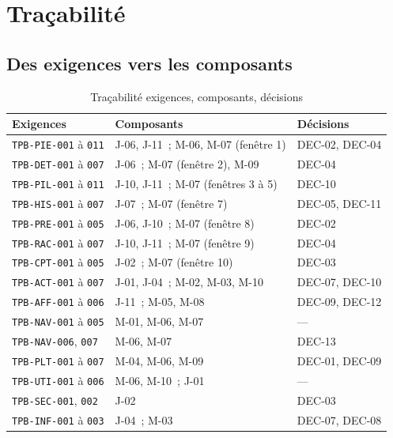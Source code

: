 \section{Traçabilité}

\subsection{Des exigences vers les composants}

\begin{table}[H]
  \centering\small
  \begin{tabularx}{\linewidth}{@{}>{\raggedright\arraybackslash}p{36mm}>{\raggedright\arraybackslash}p{58mm}X@{}}
    \toprule
    \textbf{Exigences} & \textbf{Composants} & \textbf{Décisions} \\
    \midrule
    \texttt{TPB-PIE-001} à \texttt{011} & J-06, J-11~; M-06, M-07 (fenêtre 1) & DEC-02, DEC-04 \\
    \texttt{TPB-DET-001} à \texttt{007} & J-06~; M-07 (fenêtre 2), M-09 & DEC-04 \\
    \texttt{TPB-PIL-001} à \texttt{011} & J-10, J-11~; M-07 (fenêtres 3 à 5) & DEC-10 \\
    \texttt{TPB-HIS-001} à \texttt{007} & J-07~; M-07 (fenêtre 7) & DEC-05, DEC-11 \\
    \texttt{TPB-PRE-001} à \texttt{005} & J-06, J-10~; M-07 (fenêtre 8) & DEC-02 \\
    \texttt{TPB-RAC-001} à \texttt{007} & J-10, J-11~; M-07 (fenêtre 9) & DEC-04 \\
    \texttt{TPB-CPT-001} à \texttt{005} & J-02~; M-07 (fenêtre 10) & DEC-03 \\
    \texttt{TPB-ACT-001} à \texttt{007} & J-01, J-04~; M-02, M-03, M-10 & DEC-07, DEC-10 \\
    \texttt{TPB-AFF-001} à \texttt{006} & J-11~; M-05, M-08 & DEC-09, DEC-12 \\
    \texttt{TPB-NAV-001} à \texttt{005} & M-01, M-06, M-07 & --- \\
    \texttt{TPB-NAV-006}, \texttt{007} & M-06, M-07 & DEC-13 \\
    \texttt{TPB-PLT-001} à \texttt{007} & M-04, M-06, M-09 & DEC-01, DEC-09 \\
    \texttt{TPB-UTI-001} à \texttt{006} & M-06, M-10~; J-01 & --- \\
    \texttt{TPB-SEC-001}, \texttt{002} & J-02 & DEC-03 \\
    \texttt{TPB-INF-001} à \texttt{003} & J-04~; M-03 & DEC-07, DEC-08 \\
    \bottomrule
  \end{tabularx}
  \caption{Traçabilité exigences, composants, décisions}
\end{table}

